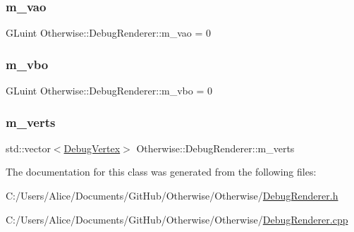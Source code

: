 \subsubsection{\texorpdfstring{m\+\_\+vao}{m\_vao}}
{\footnotesize\ttfamily G\+Luint Otherwise\+::\+Debug\+Renderer\+::m\+\_\+vao = 0\hspace{0.3cm}{\ttfamily [private]}}

\mbox{\label{class_otherwise_1_1_debug_renderer_ab225e8b51a3c0dae05445d7574dc733d}} 
\subsubsection{\texorpdfstring{m\+\_\+vbo}{m\_vbo}}
{\footnotesize\ttfamily G\+Luint Otherwise\+::\+Debug\+Renderer\+::m\+\_\+vbo = 0\hspace{0.3cm}{\ttfamily [private]}}

\mbox{\label{class_otherwise_1_1_debug_renderer_af52399f545c549d6ddd517d68052d165}} 
\subsubsection{\texorpdfstring{m\+\_\+verts}{m\_verts}}
{\footnotesize\ttfamily std\+::vector$<$\hyperlink{struct_otherwise_1_1_debug_renderer_1_1_debug_vertex}{Debug\+Vertex}$>$ Otherwise\+::\+Debug\+Renderer\+::m\+\_\+verts\hspace{0.3cm}{\ttfamily [private]}}



The documentation for this class was generated from the following files\+:\begin{DoxyCompactItemize}
\item 
C\+:/\+Users/\+Alice/\+Documents/\+Git\+Hub/\+Otherwise/\+Otherwise/\hyperlink{_debug_renderer_8h}{Debug\+Renderer.\+h}\item 
C\+:/\+Users/\+Alice/\+Documents/\+Git\+Hub/\+Otherwise/\+Otherwise/\hyperlink{_debug_renderer_8cpp}{Debug\+Renderer.\+cpp}\end{DoxyCompactItemize}
